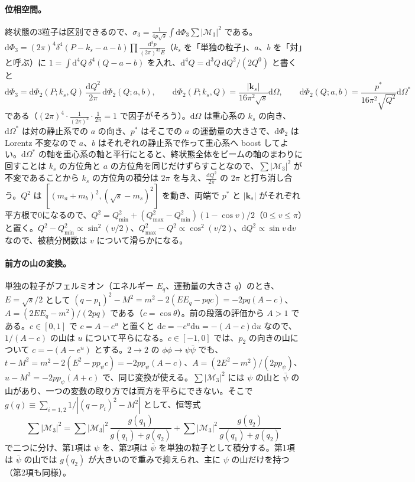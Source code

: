 \documentclass[a4paper,10pt]{ltjsarticle}
\newcommand{\dd}{\mathrm{d}}
\begin{document}
\paragraph{位相空間。}終状態の3粒子は区別できるので、$\sigma_3=\frac{1}{4p\sqrt s}\int\dd\Phi_3\sum|\mathcal M_3|^2$ である。$\dd\Phi_3=(2\pi)^4\delta^4(P-k_s-a-b)\prod\frac{\dd^3p}{(2\pi)^32E}$（$k_s$ を「単独の粒子」、$a$、$b$ を「対」と呼ぶ）に $1=\int\dd^4Q\,\delta^4(Q-a-b)$ を入れ、$\dd^4Q=\dd^3Q\,\dd Q^2/(2Q^0)$ と書くと
\begin{equation*}
\dd\Phi_3=\dd\Phi_2(P;k_s,Q)\,\frac{\dd Q^2}{2\pi}\,\dd\Phi_2(Q;a,b),\qquad
\dd\Phi_2(P;k_s,Q)=\frac{|\boldsymbol k_s|}{16\pi^2\sqrt s}\dd\Omega,\qquad
\dd\Phi_2(Q;a,b)=\frac{p^*}{16\pi^2\sqrt{Q^2}}\dd\Omega^*
\end{equation*}
である（$(2\pi)^4\cdot\frac{1}{(2\pi)^3}\cdot\frac{1}{2\pi}=1$ で因子がそろう）。$\dd\Omega$ は重心系の $k_s$ の向き、$\dd\Omega^*$ は対の静止系での $a$ の向き、$p^*$ はそこでの $a$ の運動量の大きさで、$\dd\Phi_2$ は Lorentz 不変なので $a$、$b$ はそれぞれの静止系で作って重心系へ boost してよい。$\dd\Omega^*$ の軸を重心系の軸と平行にとると、終状態全体をビームの軸のまわりに回すことは $k_s$ の方位角と $a$ の方位角を同じだけずらすことなので、$\sum|\mathcal M_3|^2$ が不変であることから $k_s$ の方位角の積分は $2\pi$ を与え、$\frac{\dd Q^2}{2\pi}$ の $2\pi$ と打ち消し合う。$Q^2$ は $[(m_a+m_b)^2,(\sqrt s-m_s)^2]$ を動き、両端で $p^*$ と $|\boldsymbol k_s|$ がそれぞれ平方根で0になるので、$Q^2=Q^2_{\min}+(Q^2_{\max}-Q^2_{\min})(1-\cos v)/2$（$0\le v\le\pi$）と置く。$Q^2-Q^2_{\min}\propto\sin^2(v/2)$、$Q^2_{\max}-Q^2\propto\cos^2(v/2)$、$\dd Q^2\propto\sin v\,\dd v$ なので、被積分関数は $v$ について滑らかになる。

\paragraph{前方の山の変換。}単独の粒子がフェルミオン（エネルギー $E_q$、運動量の大きさ $q$）のとき、$E=\sqrt s/2$ として $(q-p_1)^2-M^2=m^2-2(EE_q-pqc)=-2pq(A-c)$、$A=(2EE_q-m^2)/(2pq)$ である（$c=\cos\theta$）。前の段落の評価から $A>1$ である。$c\in[0,1]$ で $c=A-e^u$ と置くと $\dd c=-e^u\dd u=-(A-c)\dd u$ なので、$1/(A-c)$ の山は $u$ について平らになる。$c\in[-1,0]$ では、$p_2$ の向きの山について $c=-(A-e^u)$ とする。$2\to2$ の $\phi\phi\to\psi\bar\psi$ でも、$t-M^2=m^2-2(E^2-pp_\psi c)=-2pp_\psi(A-c)$、$A=(2E^2-m^2)/(2pp_\psi)$、$u-M^2=-2pp_\psi(A+c)$ で、同じ変換が使える。$\sum|\mathcal M_3|^2$ には $\psi$ の山と $\bar\psi$ の山があり、一つの変数の取り方では両方を平らにできない。そこで $g(q)\equiv\sum_{i=1,2}1/|(q-p_i)^2-M^2|$ として、恒等式
\begin{equation*}
\sum|\mathcal M_3|^2=\sum|\mathcal M_3|^2\,\frac{g(q_1)}{g(q_1)+g(q_2)}+\sum|\mathcal M_3|^2\,\frac{g(q_2)}{g(q_1)+g(q_2)}
\end{equation*}
で二つに分け、第1項は $\psi$ を、第2項は $\bar\psi$ を単独の粒子として積分する。第1項は $\bar\psi$ の山では $g(q_2)$ が大きいので重みで抑えられ、主に $\psi$ の山だけを持つ（第2項も同様）。
\end{document}
